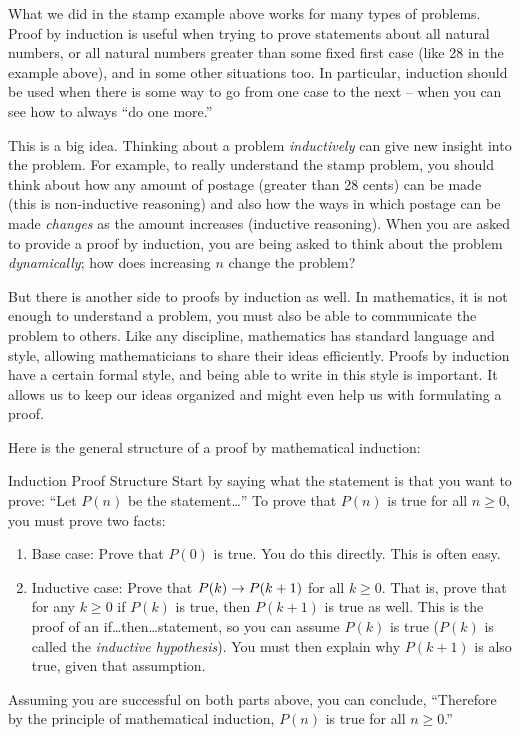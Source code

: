 \documentclass[12pt]{article}
\begin{document}
What we did in the stamp example above works for many types of problems.  Proof by induction is useful when trying to prove statements about all natural numbers, or all natural numbers greater than some fixed first case (like 28 in the example above), and in some other situations too.  In particular, induction should be used when there is some way to go from one case to the next -- when you can see how to always ``do one more.''

This is a big idea.  Thinking about a problem {\em inductively} can give new insight into the problem.  For example, to really understand the stamp problem, you should think about how any amount of postage (greater than 28 cents) can be made (this is non-inductive reasoning) and also how the ways in which postage can be made {\em changes} as the amount increases (inductive reasoning).  When you are asked to provide a proof by induction, you are being asked to think about the problem {\em dynamically}; how does increasing $n$ change the problem?

But there is another side to proofs by induction as well.  In mathematics, it is not enough to understand a problem, you must also be able to communicate the problem to others.  Like any discipline, mathematics has standard language and style, allowing mathematicians to share their ideas efficiently.  Proofs by induction have a certain formal style, and being able to write in this style is important.  It allows us to keep our ideas organized and might even help us with formulating a proof.

Here is the general structure of a proof by mathematical induction:

\begin{defbox}{Induction Proof Structure}
Start by saying what the statement is that you want to prove: ``Let $P(n)$ be the statement\ldots''
To prove that $P(n)$ is true for all $n \ge 0$, you must prove two facts:

\begin{enumerate}
  \item Base case: Prove that $P(0)$ is true.  You do this directly.  This is often easy.
  \item Inductive case: Prove that $P(k) \rightarrow P(k+1)$ for all $k \ge 0$.  That is, prove that for any $k \ge 0$ if $P(k)$ is true, then $P(k+1)$ is true as well.  This is the proof of an if\ldots then\ldots statement, so you can assume $P(k)$ is true ($P(k)$ is called the {\em inductive hypothesis}).  You must then explain why $P(k+1)$ is also true, given that assumption.
\end{enumerate}

Assuming you are successful on both parts above, you can conclude, ``Therefore by the principle of mathematical induction, $P(n)$ is true for all $n \ge 0$.''
\end{defbox}
\end{document}

